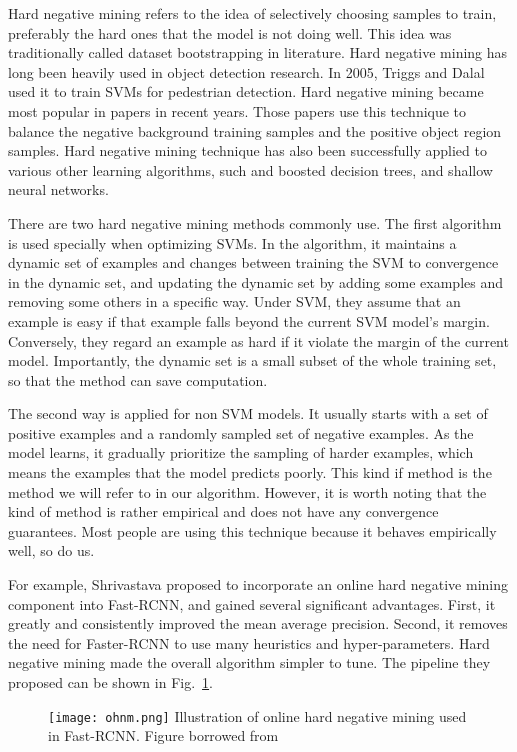 Hard negative mining refers to the idea of selectively choosing samples to train, preferably the hard ones that the model is not doing well. This idea was traditionally called dataset bootstrapping in literature\cite{sung1996learning}. Hard negative mining has long been heavily used in object detection research. In 2005, Triggs and Dalal\cite{dalal2005histograms} used it to train SVMs for pedestrian detection. Hard negative mining became most popular in papers in recent years\cite{shrivastava2016training,liu2016ssd,girshick2014rich,girshick2015fast,ren2015faster}. Those papers use this technique to balance the negative background training samples and the positive object region samples. Hard negative mining technique has also been successfully applied to various other learning algorithms, such and boosted decision trees, and shallow neural networks. 

There are two hard negative mining methods commonly use. The first algorithm is used specially when optimizing SVMs. In the algorithm, it maintains a dynamic set of examples and changes between training the SVM to convergence in the dynamic set, and updating the dynamic set by adding some examples and removing some others in a specific way\cite{felzenszwalb2010object}. Under SVM, they assume that an example is easy if that example falls beyond the current SVM model's margin. Conversely, they regard an example as hard if it violate the margin of the current model. Importantly, the dynamic set is a small subset of the whole training set, so that the method can save computation.

The second way is applied for non SVM models. It usually starts with a set of positive examples and a randomly sampled set of negative examples. As the model learns, it gradually prioritize the sampling of harder examples, which means the examples that the model predicts poorly. This kind if method is the method we will refer to in our algorithm. However, it is worth noting that the kind of method is rather empirical and does not have any convergence guarantees. Most people are using this technique because it behaves empirically well, so do us.

For example, Shrivastava\cite{shrivastava2016training} proposed to incorporate an online hard negative mining component into Fast-RCNN, and gained several significant advantages. First, it greatly and consistently improved the mean average precision. Second, it removes the need for Faster-RCNN to use many heuristics and hyper-parameters. Hard negative mining made the overall algorithm simpler to tune. The pipeline they proposed can be shown in Fig.~\ref{fig:ohnm}.
\begin{figure}[!htp]
	\centering
	\texttt{[image: ohnm.png]}
	{Illustration of online hard negative mining\cite{shrivastava2016training} used in Fast-RCNN. Figure borrowed from \parencite{shrivastava2016training}}
	\label{fig:ohnm}
\end{figure}

